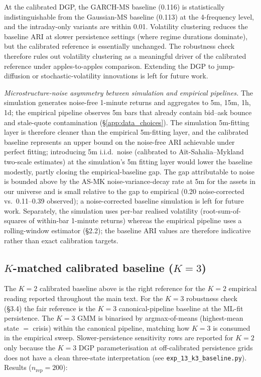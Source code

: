 \documentclass[preprint,12pt,authoryear]{elsarticle}
\begin{document}
\smallskip
\noindent At the calibrated DGP, the GARCH-MS baseline (0.116) is statistically indistinguishable from the Gaussian-MS baseline (0.113) at the 4-frequency level, and the intraday-only variants are within 0.01. Volatility clustering reduces the baseline ARI at slower persistence settings (where regime durations dominate), but the calibrated reference is essentially unchanged. The robustness check therefore rules out volatility clustering as a meaningful driver of the calibrated reference under apples-to-apples comparison. Extending the DGP to jump-diffusion or stochastic-volatility innovations is left for future work.

\emph{Microstructure-noise asymmetry between simulation and empirical pipelines.} The simulation generates noise-free 1-minute returns and aggregates to 5m, 15m, 1h, 1d; the empirical pipeline observes 5m bars that already contain bid--ask bounce and stale-quote contamination (\S\ref{app:data_choices}). The simulation 5m-fitting layer is therefore cleaner than the empirical 5m-fitting layer, and the calibrated baseline represents an upper bound on the noise-free ARI achievable under perfect fitting; introducing 5m i.i.d.\ noise (calibrated to Aït-Sahalia--Mykland two-scale estimates) at the simulation's 5m fitting layer would lower the baseline modestly, partly closing the empirical-baseline gap. The gap attributable to noise is bounded above by the AS-MK noise-variance-decay rate at 5m for the assets in our universe and is small relative to the gap to empirical (0.20 noise-corrected vs.\ 0.11--0.39 observed); a noise-corrected baseline simulation is left for future work. Separately, the simulation uses per-bar realised volatility (root-sum-of-squares of within-bar 1-minute returns) whereas the empirical pipeline uses a rolling-window estimator (\S{}2.2); the baseline ARI values are therefore indicative rather than exact calibration targets.

\subsection{$K$-matched calibrated baseline ($K{=}3$)}\label{app:k3_baseline}
The $K{=}2$ calibrated baseline above is the right reference for the $K{=}2$ empirical reading reported throughout the main text. For the $K{=}3$ robustness check (\S{}3.4) the fair reference is the $K{=}3$ canonical-pipeline baseline at the ML-fit persistence. The $K{=}3$ GMM is binarised by argmax-of-means (highest-mean state $=$ crisis) within the canonical pipeline, matching how $K{=}3$ is consumed in the empirical sweep. Slower-persistence sensitivity rows are reported for $K{=}2$ only because the $K{=}3$ DGP parameterisation at off-calibrated persistence grids does not have a clean three-state interpretation (see \texttt{exp\_13\_k3\_baseline.py}). Results ($n_{\text{rep}}=200$):
\end{document}

